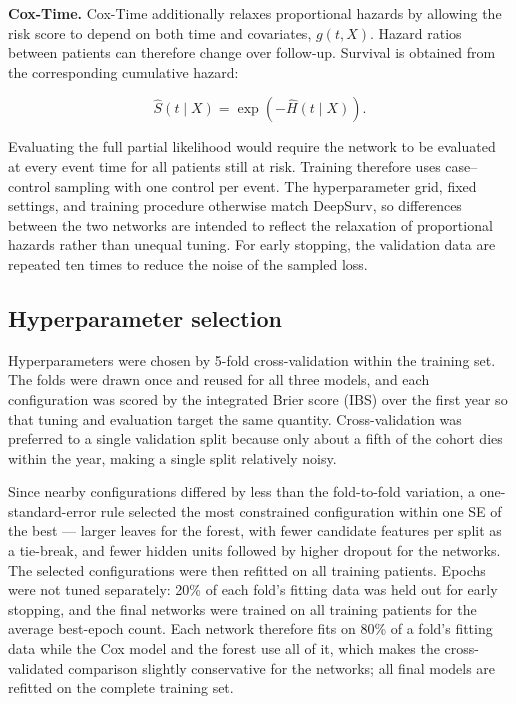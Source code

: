 \documentclass[11pt,a4paper]{article}
\begin{document}
\textbf{Cox-Time.} Cox-Time additionally relaxes proportional hazards by allowing the risk score to depend on both time and covariates, $g(t,X)$. Hazard ratios between patients can therefore change over follow-up. Survival is obtained from the corresponding cumulative hazard:

$$
\hat S(t \mid X) = \exp\left(-\hat H(t \mid X)\right).
$$

Evaluating the full partial likelihood would require the network to be evaluated at every event time for all patients still at risk. Training therefore uses case--control sampling with one control per event. The hyperparameter grid, fixed settings, and training procedure otherwise match DeepSurv, so differences between the two networks are intended to reflect the relaxation of proportional hazards rather than unequal tuning. For early stopping, the validation data are repeated ten times to reduce the noise of the sampled loss.



\subsection{Hyperparameter selection}

Hyperparameters were chosen by 5-fold cross-validation within the training set. The folds were drawn once and reused for all three models, and each configuration was scored by the integrated Brier score (IBS) over the first year so that tuning and evaluation target the same quantity. Cross-validation was preferred to a single validation split because only about a fifth of the cohort dies within the year, making a single split relatively noisy.

Since nearby configurations differed by less than the fold-to-fold variation, a one-standard-error rule selected the most constrained configuration within one SE of the best --- larger leaves for the forest, with fewer candidate features per split as a tie-break, and fewer hidden units followed by higher dropout for the networks. The selected configurations were then refitted on all training patients. Epochs were not tuned separately: 20\% of each fold's fitting data was held out for early stopping, and the final networks were trained on all training patients for the average best-epoch count. Each network therefore fits on 80\% of a fold's fitting data while the Cox model and the forest use all of it, which makes the cross-validated comparison slightly conservative for the networks; all final models are refitted on the complete training set.
\end{document}
